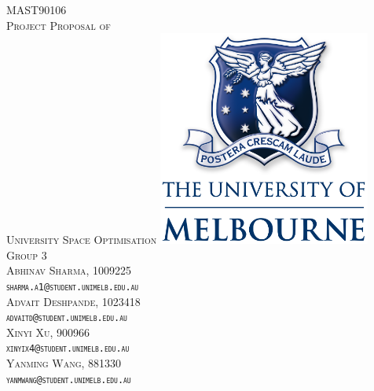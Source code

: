 \begin{titlepage}
\center %
 
\vfill
\textsc{\large{MAST90106} \\[1cm]
\large{Project Proposal of} \\[0.2cm]\LARGE{University Space Optimisation}}
\vfill
\includegraphics[width=7cm]{resources/images/unimelblogo.png}
\vfill
\textsc{\LARGE{Group 3}}
\vspace{5mm}\\
\textsc{ Abhinav Sharma, 1009225\\
    \texttt{sharma.a1@student.unimelb.edu.au} }\\
    \vspace{5mm}
\textsc{ Advait Deshpande, 1023418\\
    \texttt{advaitd@student.unimelb.edu.au}}\\
    \vspace{5mm}
\textsc{ Xinyi Xu, 900966\\
    \texttt{xinyix4@student.unimelb.edu.au}}\\
    \vspace{5mm}
\textsc{ Yanming Wang, 881330\\
    \texttt{yanmwang@student.unimelb.edu.au}}
\end{titlepage}